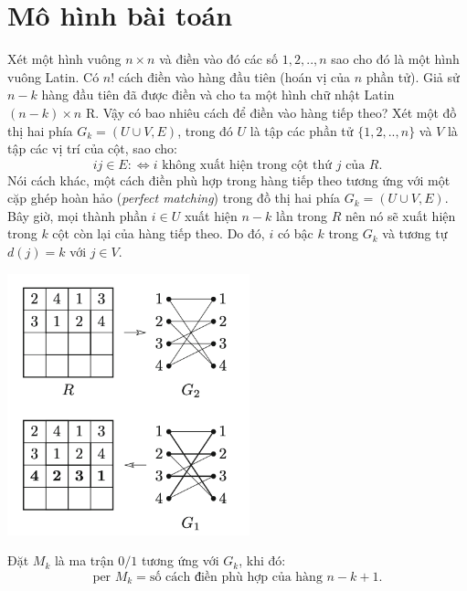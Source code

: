 \documentclass[a4paper, 12pt]{report}
\begin{document}
\section{Mô hình bài toán}
Xét một hình vuông $n \times n$ và điền vào đó các số $1,2,..,n$ sao cho đó là một hình vuông Latin. Có $n!$ cách điền vào hàng đầu tiên (hoán vị của $n$ phần tử). Giả sử $n-k$ hàng đầu tiên đã được điền và cho ta một hình chữ nhật Latin $(n-k) \times n$ R. Vậy có bao nhiêu cách để điền vào hàng tiếp theo? Xét một đồ thị hai phía $G_k = (U \cup V,E)$, trong đó $U$ là tập các phần tử $\{1,2,..,n\}$ và $V$ là tập các vị trí của cột, sao cho:
\begin{equation*}
ij \in E :\Leftrightarrow i \textrm{ không xuất hiện trong cột thứ } j \textrm{ của } R.
\end{equation*}
Nói cách khác, một cách điền phù hợp trong hàng tiếp theo tương ứng với một cặp ghép hoàn hảo (\textit{perfect matching}) trong đồ thị hai phía $G_k = (U \cup V,E)$. Bây giờ, mọi thành phần $i \in U$ xuất hiện $n-k$ lần trong $R$ nên nó sẽ xuất hiện trong $k$ cột còn lại của hàng tiếp theo. Do đó, $i$ có bậc $k$ trong $G_k$ và tương tự $d(j) = k $ với $j \in V$. \\
\begin{center}
	\includegraphics[width=7cm]{ex3}
\end{center}
Đặt $M_k$ là ma trận $0/1$ tương ứng với $G_k$, khi đó:
\begin{equation*}
	\textrm{per } M_k = \textrm{số cách điền phù hợp của hàng } n-k+1.
\end{equation*}
\end{document}
